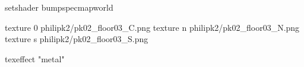 setshader bumpspecmapworld

texture 0 philipk2/pk02_floor03_C.png
texture n philipk2/pk02_floor03_N.png
texture s philipk2/pk02_floor03_S.png

texeffect "metal"
